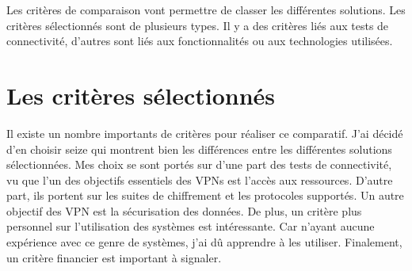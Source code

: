 Les critères de comparaison vont permettre de classer les différentes solutions.
Les critères sélectionnés sont de plusieurs types.
Il y a des critères liés aux tests de connectivité, d'autres sont liés aux fonctionnalités ou aux technologies utilisées.

\section{Les critères sélectionnés}
Il existe un nombre importants de critères pour réaliser ce comparatif.
J'ai décidé d'en choisir seize qui montrent bien les différences entre les différentes solutions sélectionnées. 
Mes choix se sont portés sur d'une part des tests de connectivité, vu que l'un des objectifs essentiels des VPNs est l'accès aux ressources.
D'autre part, ils portent sur les suites de chiffrement et les protocoles supportés.
Un autre objectif des VPN est la sécurisation des données. 
De plus, un critère plus personnel sur l'utilisation des systèmes est intéressante.
Car n'ayant aucune expérience avec ce genre de systèmes, j'ai dû apprendre à les utiliser.
Finalement, un critère financier est important à signaler.
